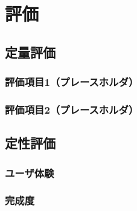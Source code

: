 \chapter{評価}
\label{ch:evaluation}

\section{定量評価}

\subsection{評価項目1（プレースホルダ）}

\subsection{評価項目2（プレースホルダ）}

\section{定性評価}

\subsection{ユーザ体験}

\subsection{完成度}
